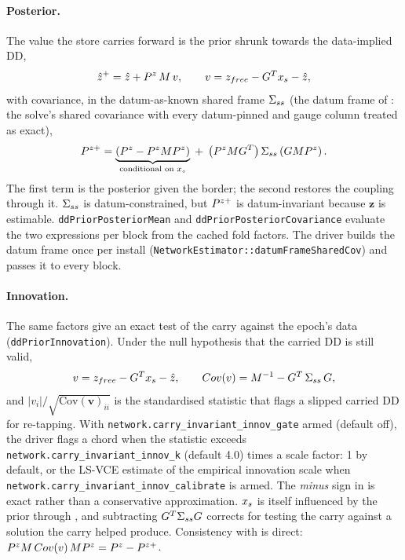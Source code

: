 \documentclass[main.tex]{subfiles}
\begin{document}
\paragraph{Posterior.}
The value the store carries forward is the prior shrunk towards the
data-implied DD,
\begin{equation}
\hat{z}^{+} = \hat{z} + P^{z}\,M\,v,
\qquad
v = z_{free} - G^{T}x_s - \hat{z},
\label{eq:carry-post-mean}
\end{equation}
with covariance, in the datum-as-known shared frame $\Sigma_{ss}$ (the
datum frame of : the
solve's shared covariance with every datum-pinned and gauge column
treated as exact),
\begin{equation}
P^{z+} = \underbrace{\left(P^{z} - P^{z}MP^{z}\right)}
             _{\text{conditional on }x_s}
             \;+\; \left(P^{z}MG^{T}\right)\Sigma_{ss}
                   \left(GMP^{z}\right).
\label{eq:carry-post-cov}
\end{equation}
The first term is the posterior given the border; the second restores
the coupling through it.  $\Sigma_{ss}$ is datum-constrained, but $P^{z+}$
is datum-invariant because $\bm{z}$ is estimable.
\texttt{ddPriorPosteriorMean} and \texttt{ddPriorPosteriorCovariance}
evaluate the two expressions per block from the cached fold factors.
The driver builds the datum frame once per install
(\texttt{NetworkEstimator::datumFrameSharedCov}) and passes it to every
block.

\paragraph{Innovation.}
The same factors give an exact test of the carry against the epoch's
data (\texttt{ddPriorInnovation}).  Under the null hypothesis that the
carried DD is still valid,
\begin{equation}
v = z_{free} - G^{T}x_s - \hat{z},
\qquad
Cov(v) = M^{-1} - G^{T}\,\Sigma_{ss}\,G ,
\label{eq:carry-innov}
\end{equation}
and $|v_i|/\sqrt{\mathrm{Cov}(\bm{v})_{ii}}$ is the standardised
statistic that flags a slipped carried DD for re-tapping.  With
\texttt{network.carry\_invariant\_innov\_gate} armed (default off), the
driver flags a chord when the statistic exceeds
\texttt{network.carry\_invariant\_innov\_k} (default 4.0) times a
scale factor: 1 by default, or the LS-VCE estimate of the empirical
innovation scale when \texttt{network.carry\_invariant\_innov\_calibrate}
is armed.  The \emph{minus} sign in  is
exact rather than a conservative approximation.  $x_s$ is itself
influenced by the prior through , and subtracting
$G^{T}\Sigma_{ss}G$ corrects for testing the carry against a
solution the carry helped produce.  Consistency with
 is direct:
$P^{z}M\,Cov(v)\,MP^{z} = P^{z} -
P^{z+}$.
\end{document}
